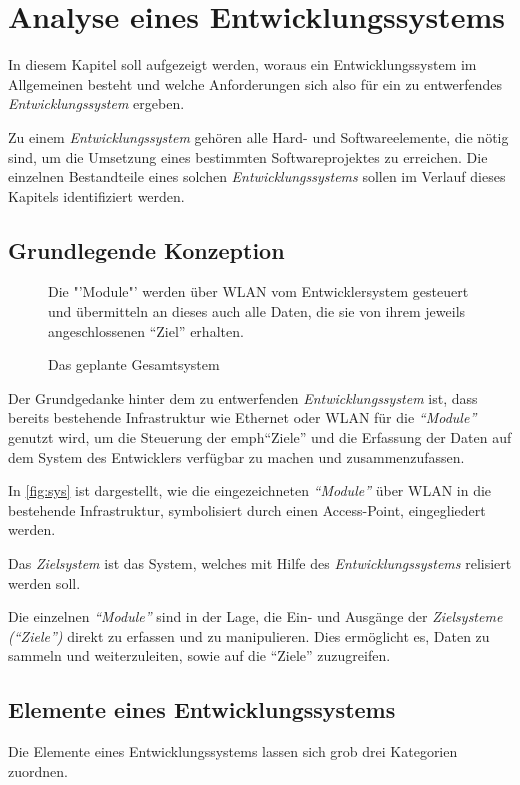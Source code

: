 \chapter{Analyse eines Entwicklungssystems}\label{chap:analyse}
\minitoc
In diesem Kapitel soll aufgezeigt werden, woraus ein Entwicklungssystem
im Allgemeinen besteht und welche Anforderungen sich also für ein zu
entwerfendes \emph{Entwicklungssystem} ergeben.
\begin{definition}[Entwicklungssystem]
Zu einem \emph{Entwicklungssystem} gehören
alle Hard- und Softwareelemente, die nötig sind, um die Umsetzung eines
bestimmten Softwareprojektes zu erreichen. Die einzelnen Bestandteile eines
solchen \emph{Entwicklungssystems} sollen im Verlauf dieses Kapitels
identifiziert werden.
\end{definition}
\section{Grundlegende Konzeption}
\begin{figure}[H]
\centering
\def\svgwidth{\columnwidth}

\caption{Das geplante Gesamtsystem}{Die "'Module"' werden über WLAN
vom Entwicklersystem gesteuert und übermitteln an dieses auch alle
Daten, die sie von ihrem jeweils angeschlossenen "`Ziel"' erhalten.}
\label{fig:sys}
\end{figure}
Der Grundgedanke hinter dem zu entwerfenden \emph{Entwicklungssystem} ist, dass
bereits bestehende Infrastruktur wie Ethernet oder WLAN für die \emph{"`Module"'}
genutzt wird, um die Steuerung der emph{"`Ziele"'} und die Erfassung der Daten auf
dem System des Entwicklers verfügbar zu machen und zusammenzufassen.

In \autoref{fig:sys} ist dargestellt, wie die eingezeichneten \emph{"`Module"'}
über WLAN in die bestehende Infrastruktur, symbolisiert durch einen
Access-Point, eingegliedert werden.
\begin{definition}[Zielsystem]
Das \emph{Zielsystem} ist das System, welches mit Hilfe des
\emph{Entwicklungssystems} relisiert werden soll.
\end{definition}
Die einzelnen \emph{"`Module"'} sind in der Lage, die Ein- und Ausgänge
der \emph{Zielsysteme ("`Ziele"')} direkt zu erfassen und zu manipulieren. Dies
ermöglicht es, Daten zu sammeln und weiterzuleiten, sowie auf die "`Ziele"'
zuzugreifen.

\section{Elemente eines Entwicklungssystems}
Die Elemente eines Entwicklungssystems lassen sich grob drei Kategorien
zuordnen. 

